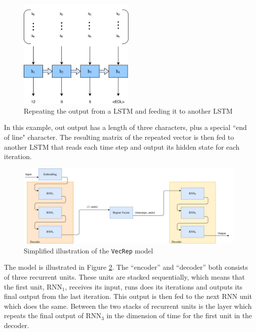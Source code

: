 \begin{figure}[ht]
    \centering
    \includegraphics[width=0.5\textwidth]{fig/development_process/lstm-vector-projection-decoder.png}
    \caption{Repeating the output from a LSTM and feeding it to another LSTM}
    \label{fig:lstm-vector-projection-decoder}
\end{figure}

In this example, out output has a length of three characters, plus a special ``end of line" character. The resulting matrix of the repeated vector is then fed to another LSTM that reads each time step and output its hidden state for each iteration.

\begin{figure}[!ht]
    \centering
    \includegraphics[width=1\textwidth]{fig/models/vecrep_model.png}
    \caption{Simplified illustration of the {\tt VecRep} model}
    \label{fig:vecrep_model}
\end{figure}

The model is illustrated in Figure \ref{fig:vecrep_model}. The ``encoder'' and ``decoder'' both consists of three recurrent units. These units are stacked sequentially, which means that the first unit, \(\text{RNN}_1\), receives its input, runs does its iterations and outputs its final output from the last iteration. This output is then fed to the next RNN unit which does the same. Between the two stacks of recurrent units is the layer which repeats the final output of \(\text{RNN}_3\) in the dimension of time for the first unit in the decoder.

